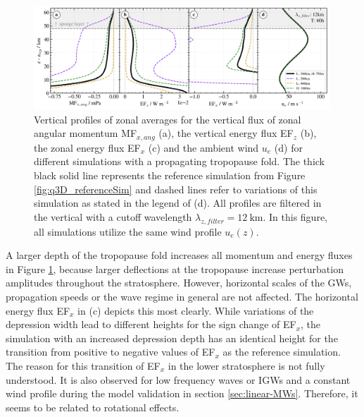 \begin{figure}[t]
    \centering
    \includegraphics[width=0.99\textwidth]{figures_q3D/TD-zprofiles-translbq3D_shape-T60h-avg.png}
    \caption{Vertical profiles of zonal averages for the vertical flux of zonal angular momentum MF$_{x,ang}$ (a), the vertical energy flux EF$_z$ (b), the zonal energy flux EF$_x$ (c) and the ambient wind $u_e$ (d) for different simulations with a propagating tropopause fold. The thick black solid line represents the reference simulation from Figure \ref{fig:q3D_referenceSim} and dashed lines refer to variations of this simulation as stated in the legend of (d). All profiles are filtered in the vertical with a cutoff wavelength $\lambda_{z,filter}=\SI{12}{\kilo\meter}$. In this figure, all simulations utilize the same wind profile $u_e(z)$.}
    \label{fig:q3D_shape}
\end{figure}
A larger depth of the tropopause fold increases all momentum and energy fluxes in Figure \ref{fig:q3D_shape}, because larger deflections at the tropopause increase perturbation amplitudes throughout the stratosphere. However, horizontal scales of the GWs, propagation speeds or the wave regime in general are not affected. The horizontal energy flux EF$_x$ in (c) depicts this most clearly. While variations of the depression width lead to different heights for the sign change of EF$_x$, the simulation with an increased depression depth has an identical height for the transition from positive to negative values of EF$_x$ as the reference simulation. The reason for this transition of EF$_x$ in the lower stratosphere is not fully understood. It is also observed for low frequency waves or IGWs and a constant wind profile during the model validation in section \ref{sec:linear-MWs}. Therefore, it seems to be related to rotational effects.
%
